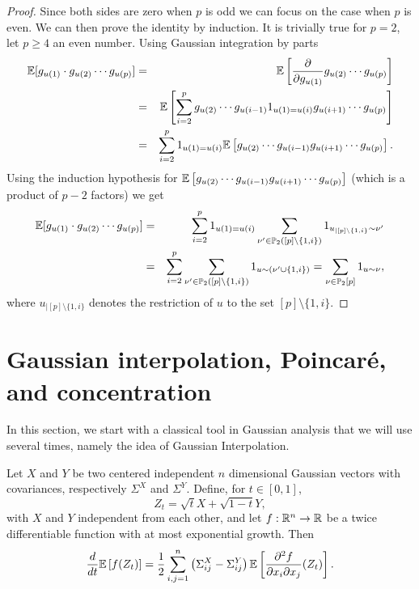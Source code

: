 \begin{proof}
Since both sides are zero when $p$ is odd we can focus on the case when $p$ is even. We can then prove the identity by induction. It is trivially true for $p=2$, let $p\geq 4$ an even number. Using Gaussian integration by parts
\begin{eqnarray*}
\mathbb{E}[g_{u(1)}\cdot g_{u(2)} \cdots g_{u(p)}] & = & \mathbb{E}\left[\frac{\partial}{\partial g_{u(1)}} g_{u(2)} \cdots g_{u(p)}\right] \\
&=& \mathbb{E}\left[\sum_{i=2}^p g_{u(2)} \cdots g_{u(i-1)} 1_{u(1)=u(i)} g_{u(i+1)}\cdots g_{u(p)}\right] \\
&=&\sum_{i=2}^p 1_{u(1)=u(i)} \mathbb{E}\left[ g_{u(2)} \cdots g_{u(i-1)} g_{u(i+1)}\cdots g_{u(p)}\right]. \\
\end{eqnarray*}
Using the induction hypothesis for $\mathbb{E}\left[ g_{u(2)} \cdots g_{u(i-1)} g_{u(i+1)}\cdots g_{u(p)}\right]$ (which is a product of $p-2$ factors) we get
\begin{eqnarray*}
\mathbb{E}[g_{u(1)}\cdot g_{u(2)} \cdots g_{u(p)}]  & = & \sum_{i=2}^p 1_{u(1)=u(i)} \sum_{\nu'\in\mathbb{P}_2([p]\setminus\{1,i\})} 1_{u_{|[p]\setminus\{1,i\}}\sim\nu'} \\
& = & \sum_{i=2}^p \sum_{\nu'\in\mathbb{P}_2([p]\setminus\{1,i\} )} 1_{u\sim(\nu'\cup\{1,i\}) } = \sum_{\nu\in \mathbb{P}_2[p]} 1_{u \sim \nu},
\end{eqnarray*}
where $u_{|[p]\setminus\{1,i\} }$ denotes the restriction of $u$ to the set $[p]\setminus\{1,i\}$.
\end{proof}


\section{Gaussian interpolation, Poincar\'{e}, and concentration}

In this section, we start with a classical tool in Gaussian analysis that we will use several times, namely the idea of Gaussian Interpolation.

\begin{lemma}\label{lemma:gaussianinterpolation}
Let $X$ and $Y$ be two centered independent $n$ dimensional Gaussian vectors with covariances, respectively $\Sigma^X$ and $\Sigma^Y$. Define, for $t\in[0,1]$,
\begin{equation}\label{eq:interpolationGI}
Z_t = \sqrt{t}X + \sqrt{1-t}Y,
\end{equation}
with $X$ and $Y$ independent from each other, and let $f:\mathbb{R}^n\to\mathbb{R}$ be a twice differentiable function with at most exponential growth. Then 
\begin{equation}
\frac{d}{dt} \mathbb{E} \left[ f(Z_t) \right] = \frac12 \sum_{i,j=1}^n \left( \Sigma^X_{ij} - \Sigma^Y_{ij} \right) \mathbb{E} \left[ \frac{\partial^2 f}{\partial x_i\partial x_j}(Z_t)\right].
\end{equation}
\end{lemma}

